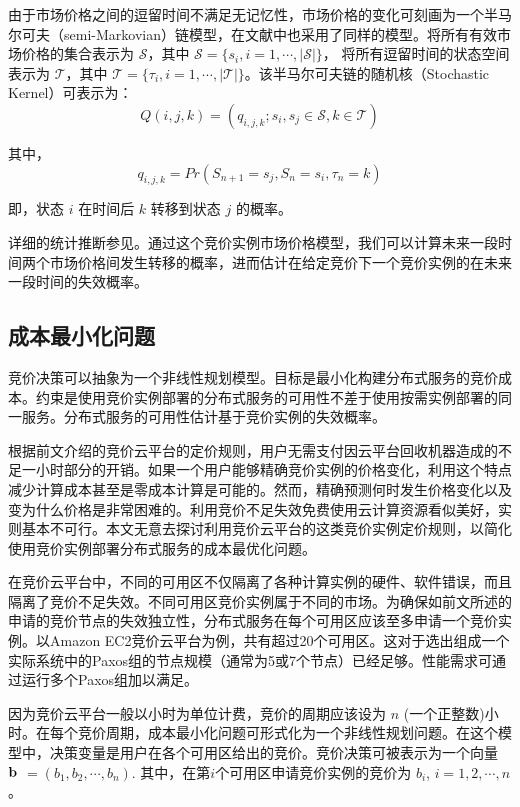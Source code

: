 由于市场价格之间的逗留时间不满足无记忆性，市场价格的变化可刻画为一个半马尔可夫（semi-Markovian）链模型，在文献\cite{song2012optimal}中也采用了同样的模型。将所有有效市场价格的集合表示为 $\mathcal{S}$，其中 $\mathcal{S} = \{s_i, i = 1, \cdots, \left|\mathcal{S}\right|\}$， 将所有逗留时间的状态空间表示为 $\mathcal{T}$，其中 $\mathcal{T} = \{\tau_i, i = 1, \cdots, \left|\mathcal{T}\right|\}$。该半马尔可夫链的随机核（Stochastic Kernel）可表示为：
\begin{equation}
Q(i, j, k) = (q_{i, j, k}; s_i, s_j \in \mathcal{S}, k \in \mathcal{T})
\end{equation}

其中，
\begin{equation}
q_{i, j, k} = Pr(S_{n+1} = s_j, S_n = s_i, \tau_n = k)
\end{equation}

即，状态 $i$ 在时间后 $k$ 转移到状态 $j$ 的概率。

详细的统计推断参见\cite{song2012optimal}。通过这个竞价实例市场价格模型，我们可以计算未来一段时间两个市场价格间发生转移的概率，进而估计在给定竞价下一个竞价实例的在未来一段时间的失效概率。

\subsection{成本最小化问题}
竞价决策可以抽象为一个非线性规划模型。目标是最小化构建分布式服务的竞价成本。约束是使用竞价实例部署的分布式服务的可用性不差于使用按需实例部署的同一服务。分布式服务的可用性估计基于竞价实例的失效概率。

根据前文介绍的竞价云平台的定价规则，用户无需支付因云平台回收机器造成的不足一小时部分的开销。如果一个用户能够精确竞价实例的价格变化，利用这个特点减少计算成本甚至是零成本计算是可能的。然而，精确预测何时发生价格变化以及变为什么价格是非常困难的。利用竞价不足失效免费使用云计算资源看似美好，实则基本不可行。本文无意去探讨利用竞价云平台的这类竞价实例定价规则，以简化使用竞价实例部署分布式服务的成本最优化问题。

在竞价云平台中，不同的可用区不仅隔离了各种计算实例的硬件、软件错误，而且隔离了竞价不足失效。不同可用区竞价实例属于不同的市场。为确保如前文所述的申请的竞价节点的失效独立性，分布式服务在每个可用区应该至多申请一个竞价实例。以Amazon EC2竞价云平台为例，共有超过20个可用区。这对于选出组成一个实际系统中的Paxos组的节点规模（通常为5或7个节点）\cite{Burrows:2006:CLS:1298455.1298487}已经足够。性能需求可通过运行多个Paxos组加以满足。

因为竞价云平台一般以小时为单位计费，竞价的周期应该设为 $n$ (一个正整数)小时。在每个竞价周期，成本最小化问题可形式化为一个非线性规划问题。在这个模型中，决策变量是用户在各个可用区给出的竞价。竞价决策可被表示为一个向量 $\bf b$ $= (b_1, b_2, \cdots, b_n)$. 其中，在第$i$个可用区申请竞价实例的竞价为 $b_i$, $i = 1, 2, \cdots, n$。

